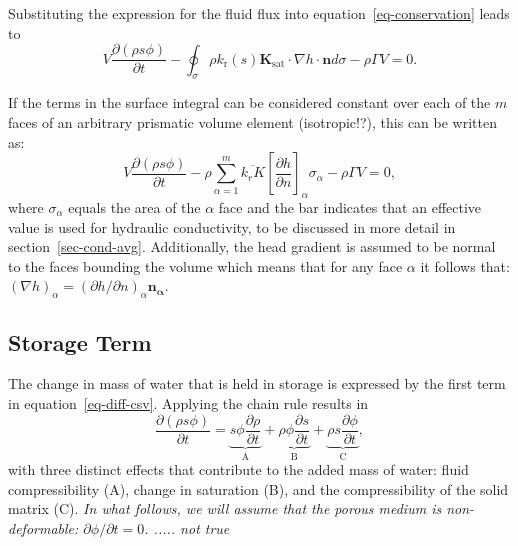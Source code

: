 \documentclass[fleqn]{article}
\begin{document}
Substituting the expression for the fluid flux into equation~\ref{eq-conservation}
leads to
\begin{equation}
  V \frac{\partial (\rho s \phi)}{\partial t} -
  \oint_\sigma \rho k_\text{r}(s) \mathbf{K}_{\textrm{sat}}
  \cdot \nabla h \cdot \mathbf{n} d\sigma -
  \rho \Gamma V = 0.
\end{equation}

If the terms in the surface integral can be considered constant over each of the 
$m$ faces of an arbitrary prismatic volume element (isotropic!?), 
this can be written as:
\begin{equation}
  V \frac{\partial (\rho s \phi)}{\partial t} -
  \rho \sum_{\alpha=1}^{m} \overline{k_r K}
  \left[\frac{\partial h}{\partial n}\right]_\alpha \sigma_\alpha -
  \rho \Gamma V = 0,
  \label{eq-diff-csv}
\end{equation}
where $\sigma_\alpha$ equals the area of the $\alpha$ face and the bar indicates 
that an effective value is used for hydraulic conductivity, to be discussed 
in more detail in section~\ref{sec-cond-avg}. Additionally, the head 
gradient is assumed to be normal to the faces bounding the volume which
means that for any face $\alpha$ it follows that:
$(\nabla h)_\alpha = (\partial h/\partial n)_\alpha \mathbf{n_\alpha}$.

\subsection{Storage Term}
The change in mass of water that is held in storage is expressed by the first 
term in equation~\ref{eq-diff-csv}. Applying the chain rule results in
\begin{equation}
  \frac{\partial (\rho s \phi)}{\partial t} =
  \underbrace{s \phi \frac{\partial \rho}{\partial t}}_\text{A} +
  \underbrace{\rho \phi \frac{\partial s}{\partial t}}_\text{B} +
  \underbrace{\rho s \frac{\partial \phi}{\partial t}}_\text{C},
\end{equation}
with three distinct effects that contribute to the added mass of water: fluid
compressibility (A), change in saturation (B), and the compressibility of the
solid matrix (C). \textit{In what follows, we will assume that the porous medium
is non-deformable: $\partial \phi/\partial t = 0$. ..... not true}
\end{document}
